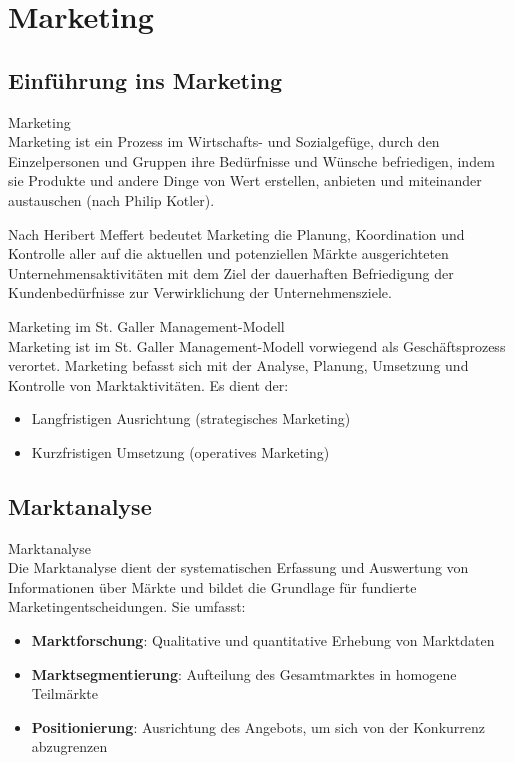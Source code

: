 \section{Marketing}

\subsection{Einführung ins Marketing}

\begin{definition}{Marketing}\\
Marketing ist ein Prozess im Wirtschafts- und Sozialgefüge, durch den Einzelpersonen und Gruppen ihre Bedürfnisse und Wünsche befriedigen, indem sie Produkte und andere Dinge von Wert erstellen, anbieten und miteinander austauschen (nach Philip Kotler).

Nach Heribert Meffert bedeutet Marketing die Planung, Koordination und Kontrolle aller auf die aktuellen und potenziellen Märkte ausgerichteten Unternehmensaktivitäten mit dem Ziel der dauerhaften Befriedigung der Kundenbedürfnisse zur Verwirklichung der Unternehmensziele.
\end{definition}

\begin{concept}{Marketing im St. Galler Management-Modell}\\
Marketing ist im St. Galler Management-Modell vorwiegend als Geschäftsprozess verortet. Marketing befasst sich mit der Analyse, Planung, Umsetzung und Kontrolle von Marktaktivitäten. Es dient der:
\begin{itemize}
    \item Langfristigen Ausrichtung (strategisches Marketing)
    \item Kurzfristigen Umsetzung (operatives Marketing)
\end{itemize}
\end{concept}

\subsection{Marktanalyse}

\begin{definition}{Marktanalyse}\\
Die Marktanalyse dient der systematischen Erfassung und Auswertung von Informationen über Märkte und bildet die Grundlage für fundierte Marketingentscheidungen. Sie umfasst:
\begin{itemize}
    \item \textbf{Marktforschung}: Qualitative und quantitative Erhebung von Marktdaten
    \item \textbf{Marktsegmentierung}: Aufteilung des Gesamtmarktes in homogene Teilmärkte
    \item \textbf{Positionierung}: Ausrichtung des Angebots, um sich von der Konkurrenz abzugrenzen
\end{itemize}
\end{definition}

